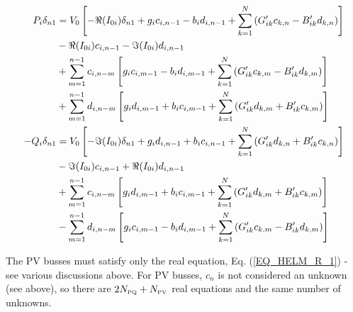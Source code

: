 \documentclass[11pt]{article}
\begin{document}
\begin{align}
	P_i\delta_{n1} &=
		V_0\left[-\Re(I_{0i})\delta_{n1} + g_ic_{i,n-1} - b_i d_{i,n-1}+ \sum_{k=1}^N\left(G'_{ik}c_{k,n} - B'_{ik}d_{k,n}\right)\right] \notag \\
		&- \Re(I_{0i})c_{i,n-1} - \Im(I_{0i})d_{i, n-1} \notag \\
		&+ \sum_{m=1}^{n-1}{
			c_{i,n-m}
			\left[
				g_ic_{i,m-1} - b_id_{i,m-1}+ \sum_{k=1}^N\left(G'_{ik}c_{k,m} - B'_{ik}d_{k,m}\right) 
			\right]
		} \notag \\
		&+ \sum_{m=1}^{n-1}{
			d_{i,n-m}
			\left[
				g_id_{i,m-1} + b_ic_{i,m-1}+ \sum_{k=1}^N\left(G'_{ik}d_{k,m} + B'_{ik}c_{k,m}\right) 
			\right]
		}
		\label{EQ_HELM_R_1_A} \\
	-Q_i\delta_{n1} &=
			V_0\left[-\Im(I_{0i})\delta_{n1} + g_id_{i,n-1} + b_i c_{i,n-1} + \sum_{k=1}^N\left(G'_{ik}d_{k,n} + B'_{ik}c_{k,n}\right)\right] \notag \\
			&- \Im(I_{0i})c_{i, n-1} + \Re(I_{0i})d_{i, n-1} \notag \\
			&+ \sum_{m=1}^{n-1}{
				c_{i,n-m}
				\left[
					g_id_{i,m-1} + b_ic_{i,m-1} + \sum_{k=1}^N\left(G'_{ik}d_{k,m} + B'_{ik}c_{k,m}\right) 
				\right]
		} \notag \\
		&- \sum_{m=1}^{n-1}{
			d_{i,n-m}
			\left[
				g_ic_{i,m-1} - b_id_{i,m-1}+ \sum_{k=1}^N\left(G'_{ik}c_{k,m} - B'_{ik}d_{k,m}\right) 
			\right]
		} 
		\label{EQ_HELM_IM_1_A}
\end{align}

The PV busses must satisfy only the real equation, Eq. (\ref{EQ_HELM_R_1}) - see various discussions above. For PV busses, $c_n$ is not considered an unknown (see above), so there are $2N_{\text{\tiny PQ}} + N_{\text{\tiny PV}}$ real equations and the same number of unknowns.
\end{document}
